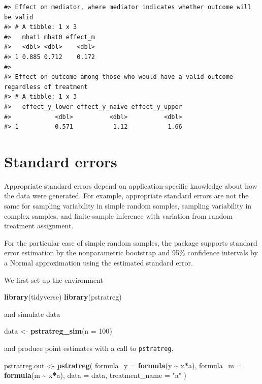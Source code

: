 \documentclass[
]{book}
\newenvironment{Shaded}{\begin{snugshade}}{\end{snugshade}}
\newcommand{\AttributeTok}[1]{\textcolor[rgb]{0.13,0.29,0.53}{#1}}
\newcommand{\DecValTok}[1]{\textcolor[rgb]{0.00,0.00,0.81}{#1}}
\newcommand{\FunctionTok}[1]{\textcolor[rgb]{0.13,0.29,0.53}{\textbf{#1}}}
\newcommand{\NormalTok}[1]{#1}
\newcommand{\OtherTok}[1]{\textcolor[rgb]{0.56,0.35,0.01}{#1}}
\newcommand{\SpecialCharTok}[1]{\textcolor[rgb]{0.81,0.36,0.00}{\textbf{#1}}}
\newcommand{\StringTok}[1]{\textcolor[rgb]{0.31,0.60,0.02}{#1}}
\begin{document}
\begin{verbatim}
#> Effect on mediator, where mediator indicates whether outcome will be valid
#> # A tibble: 1 x 3
#>   mhat1 mhat0 effect_m
#>   <dbl> <dbl>    <dbl>
#> 1 0.885 0.712    0.172
#> 
#> Effect on outcome among those who would have a valid outcome regardless of treatment
#> # A tibble: 1 x 3
#>   effect_y_lower effect_y_naive effect_y_upper
#>            <dbl>          <dbl>          <dbl>
#> 1          0.571           1.12           1.66
\end{verbatim}

\hypertarget{standard-errors}{%
\chapter{Standard errors}\label{standard-errors}}

Appropriate standard errors depend on application-specific knowledge about how the data were generated. For example, appropriate standard errors are not the same for sampling variability in simple random samples, sampling variability in complex samples, and finite-sample inference with variation from random treatment assignment.

For the particular case of simple random samples, the package supports standard error estimation by the nonparametric bootstrap and 95\% confidence intervals by a Normal approximation using the estimated standard error.

We first set up the environment

\begin{Shaded}
\begin{Highlighting}[]
\FunctionTok{library}\NormalTok{(tidyverse)}
\FunctionTok{library}\NormalTok{(pstratreg)}
\end{Highlighting}
\end{Shaded}

and simulate data

\begin{Shaded}
\begin{Highlighting}[]
\NormalTok{data }\OtherTok{\textless{}{-}} \FunctionTok{pstratreg\_sim}\NormalTok{(}\AttributeTok{n =} \DecValTok{100}\NormalTok{)}
\end{Highlighting}
\end{Shaded}

and produce point estimates with a call to \texttt{pstratreg}.

\begin{Shaded}
\begin{Highlighting}[]
\NormalTok{pstratreg.out }\OtherTok{\textless{}{-}} \FunctionTok{pstratreg}\NormalTok{(}
  \AttributeTok{formula\_y =} \FunctionTok{formula}\NormalTok{(y }\SpecialCharTok{\textasciitilde{}}\NormalTok{ x}\SpecialCharTok{*}\NormalTok{a),}
  \AttributeTok{formula\_m =} \FunctionTok{formula}\NormalTok{(m }\SpecialCharTok{\textasciitilde{}}\NormalTok{ x}\SpecialCharTok{*}\NormalTok{a),}
  \AttributeTok{data =}\NormalTok{ data,}
  \AttributeTok{treatment\_name =} \StringTok{"a"}
\NormalTok{)}
\end{Highlighting}
\end{Shaded}
\end{document}
